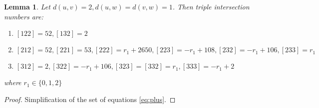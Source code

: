 \documentclass{article}
\newtheorem{lemma}{Lemma}
\theoremstyle{definition}
\theoremstyle{definition}
\theoremstyle{remark}
\begin{document}
\begin{lemma} Let $d(u,v) = 2, d(u,w) = d(v,w) = 1$. Then triple intersection numbers are:
    \begin{enumerate}
	\item $[122] = 52, [132] = 2$
	\item $[212] = 52, [221] = 53, [222] = r_1 + 2650, [223] = -r_1 + 108, [232] = -r_1 + 106, [233] = r_1$
	\item $[312] = 2, [322] = -r_1 + 106, [323] = [332] = r_1, [333] = -r_1 + 2$
    \end{enumerate}
    where $r_1 \in \{0,1,2\}$
\label{lem:2}
\end{lemma}

\begin{proof} Simplification of the set of equations \ref{eq:plus}.
\end{proof}
\end{document}
